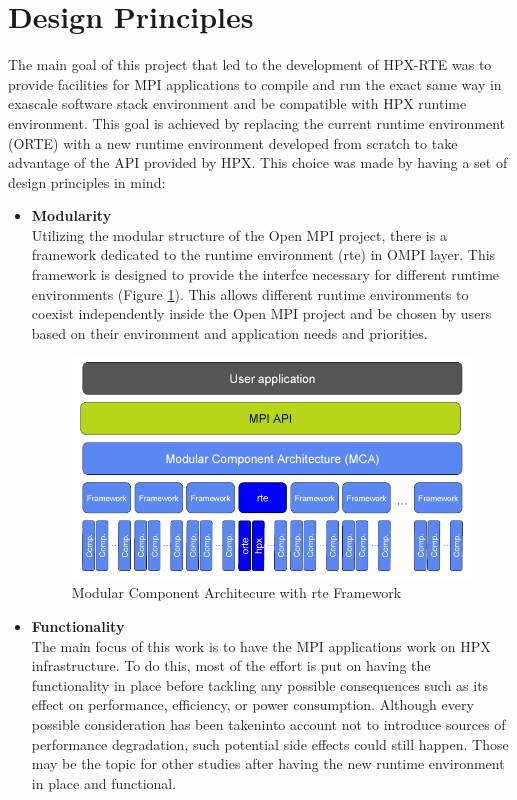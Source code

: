 \section{Design Principles}
\label{sec:design}
The main goal of this project that led to the development of HPX-RTE was to provide facilities for MPI applications to compile and run the exact same way in exascale software stack environment and be compatible with HPX runtime environment. This goal is achieved by replacing the current runtime environment (ORTE) with a new runtime environment developed from scratch to take advantage of the API provided by HPX. This choice was made by having a set of design principles in mind:

\begin{itemize}
\item \textbf{Modularity}\\
  Utilizing the modular structure of the Open MPI project, there is a framework dedicated to the runtime environment (rte) in OMPI layer. This framework is designed to provide the interfce necessary for different runtime environments (Figure \ref{fig:MCA-hpx-rte}). This allows different runtime environments to coexist independently inside the Open MPI project and be chosen by users based on their environment and application needs and priorities.

\begin{figure}[ht]
\centering
\includegraphics[scale=0.5]{images/MCA-hpx-rte.png}
\caption[Modular Component Architecure with rte Framework]{Modular Component Architecure with rte Framework}
\label{fig:MCA-hpx-rte}
\end{figure}
  
\item \textbf{Functionality}\\
  The main focus of this work is to have the MPI applications work on HPX infrastructure. To do this, most of the effort is put on having the functionality in place before tackling any possible consequences such as its effect on performance, efficiency, or power consumption. Although every possible consideration has been takeninto account not to introduce sources of performance degradation, such potential side effects could still happen. Those may be the topic for other studies after having the new runtime environment in place and functional.
  

\end{itemize}
